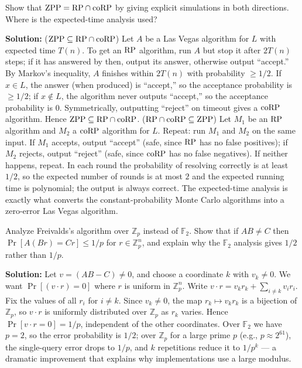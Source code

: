 \begin{exercise}[Basic]
Show that $\text{ZPP} = \text{RP} \cap \text{coRP}$ by giving explicit simulations in both directions. Where is the expected-time analysis used?
\end{exercise}
\textbf{Solution:} ($\text{ZPP} \subseteq \text{RP} \cap \text{coRP}$) Let $A$ be a Las Vegas algorithm for $L$ with expected time $T(n)$. To get an $\text{RP}$ algorithm, run $A$ but stop it after $2T(n)$ steps; if it has answered by then, output its answer, otherwise output ``accept.'' By Markov's inequality, $A$ finishes within $2T(n)$ with probability $\ge 1/2$. If $x \in L$, the answer (when produced) is ``accept,'' so the acceptance probability is $\ge 1/2$; if $x \notin L$, the algorithm never outputs ``accept,'' so the acceptance probability is $0$. Symmetrically, outputting ``reject'' on timeout gives a $\text{coRP}$ algorithm. Hence $\text{ZPP} \subseteq \text{RP} \cap \text{coRP}$. ($\text{RP} \cap \text{coRP} \subseteq \text{ZPP}$) Let $M_1$ be an $\text{RP}$ algorithm and $M_2$ a $\text{coRP}$ algorithm for $L$. Repeat: run $M_1$ and $M_2$ on the same input. If $M_1$ accepts, output ``accept'' (safe, since $\text{RP}$ has no false positives); if $M_2$ rejects, output ``reject'' (safe, since $\text{coRP}$ has no false negatives). If neither happens, repeat. In each round the probability of resolving correctly is at least $1/2$, so the expected number of rounds is at most $2$ and the expected running time is polynomial; the output is always correct. The expected-time analysis is exactly what converts the constant-probability Monte Carlo algorithms into a zero-error Las Vegas algorithm.

\begin{exercise}[Basic]
Analyze Freivalds's algorithm over $\mathbb{Z}_p$ instead of $\mathbb{F}_2$. Show that if $AB \neq C$ then $\Pr[A(Br) = Cr] \le 1/p$ for $r \in \mathbb{Z}_p^n$, and explain why the $\mathbb{F}_2$ analysis gives $1/2$ rather than $1/p$.
\end{exercise}
\textbf{Solution:} Let $v = (AB - C) \neq 0$, and choose a coordinate $k$ with $v_k \neq 0$. We want $\Pr[(v \cdot r) = 0]$ where $r$ is uniform in $\mathbb{Z}_p^n$. Write $v \cdot r = v_k r_k + \sum_{i \neq k} v_i r_i$. Fix the values of all $r_i$ for $i \neq k$. Since $v_k \neq 0$, the map $r_k \mapsto v_k r_k$ is a bijection of $\mathbb{Z}_p$, so $v \cdot r$ is uniformly distributed over $\mathbb{Z}_p$ as $r_k$ varies. Hence $\Pr[v \cdot r = 0] = 1/p$, independent of the other coordinates. Over $\mathbb{F}_2$ we have $p = 2$, so the error probability is $1/2$; over $\mathbb{Z}_p$ for a large prime $p$ (e.g., $p \approx 2^{61}$), the single-query error drops to $1/p$, and $k$ repetitions reduce it to $1/p^k$ --- a dramatic improvement that explains why implementations use a large modulus.

